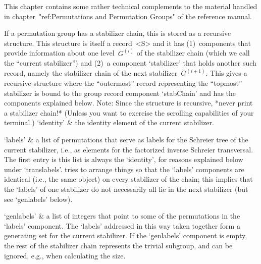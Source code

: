 
This  chapter contains some rather  technical complements to the material
handled  in chapter~"ref:Permutations  and   Permutation Groups"  of  the
reference manual.


If a  permutation group  has a   stabilizer chain, this   is stored  as a
recursive structure. This  structure  is itself  a record~<S>  and it has
(1)~components that provide information about  one level~$G^{(i)}$ of the
stabilizer chain (which  we call  the  ``current stabilizer'')  and (2)~a
component `stabilizer'  that  holds   another such  record,   namely  the
stabilizer chain  of    the next stabilizer~$G^{(i+1)}$.  This  gives   a
recursive  structure  where the  ``outermost''  record  representing  the
``topmost'' stabilizer is bound to the group record component `stabChain'
and   has the components explained below.    Note: Since the structure is
recursive, *never print a stabilizer chain!* (Unless you want to exercise
the scrolling capabilities of your terminal.)
\beginitems
`identity' &
        the identity element of the current stabilizer.

`labels' &
        a list of permutations that serve as labels for the Schreier tree
        of  the current stabilizer,  i.e., as elements for the factorized
        inverse Schreier transversal.  The  first entry  is this list  is
        always the  `identity',    for  reasons explained   below   under
        `translabels'.  {\GAP}  tries  to  arrange   things so  that  the
        `labels' components are  identical (i.e., the same {\GAP} object)
        on every stabilizer of the chain;  this implies that the `labels'
        of   one stabilizer  do  not  necessarily   all lie  in the  next
        stabilizer (but see `genlabels' below).

`genlabels' &
        a list of integers that point to some  of the permutations in the
        `labels' component. The    `labels' addressed in this   way taken
        together form a generating set for the current stabilizer. If the
        `genlabels' component is empty,  the rest of the stabilizer chain
        represents  the trivial subgroup, and  can be ignored, e.g., when
        calculating the size.

